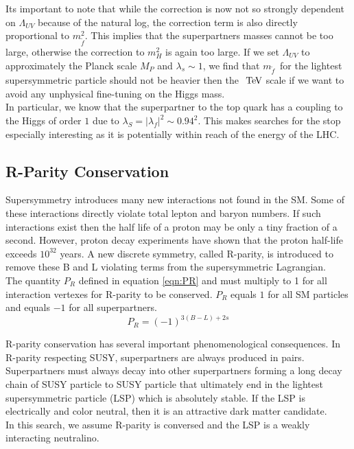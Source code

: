 \indent Its important to note that while the correction is now not so strongly dependent on $\Lambda_{UV}$ because of the natural log, the correction term is also directly proportional to $m_{\tilde{f}}^2$.  This implies that the superpartners masses cannot be too large, otherwise the correction to $m_H^2$ is again too large.  If we set $\Lambda_{UV}$ to approximately the Planck scale $M_P$ and $\lambda_s \sim 1$, we find that $m_{\tilde{f}}$~for the lightest supersymmetric particle should not be heavier then the $\tev$ scale if we want to avoid any unphysical fine-tuning on the Higgs mass.\cite{MartinSUSY}  \\

\indent In particular, we know that the superpartner to the top quark has a coupling to the Higgs of order $1$ due to $\lambda_S = |\lambda_f|^2 \sim 0.94^2$. This makes searches for the stop especially interesting as it is potentially within reach of the energy of the LHC. \\

\subsection{R-Parity Conservation}

\indent Supersymmetry introduces many new interactions not found in the SM.  Some of these interactions directly violate total lepton and baryon numbers.  If such interactions exist then the half life of a proton may be only a tiny fraction of a second.  However, proton decay experiments have shown that the proton half-life exceeds $10^{32}$ years.  A new discrete symmetry, called R-parity, is introduced to remove these B and L violating terms from the supersymmetric Lagrangian.  \\

\indent The quantity $P_R$ defined in equation \ref{eqn:PR} and must multiply to 1 for all interaction vertexes for R-parity to be conserved. $P_R$ equals $1$ for all SM particles and equals $-1$ for all superpartners.  \\

\begin{equation}
\label{eqn:PR}
P_R = (-1)^{3(B-L)+2s}
\end{equation}

\indent R-parity conservation has several important phenomenological consequences.  In R-parity respecting SUSY, superpartners are always produced in pairs.  Superpartners must always decay into other superpartners forming a long decay chain of SUSY particle to SUSY particle that ultimately end in the lightest supersymmetric particle (LSP) which is absolutely stable.  If the LSP is electrically and color neutral, then it is an attractive dark matter candidate.  \\

\indent In this search, we assume R-parity is conversed and the LSP is a weakly interacting neutralino.  \\

